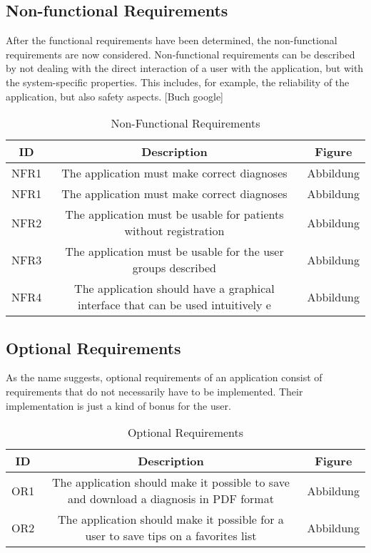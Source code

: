 \subsection{Non-functional Requirements}
After the functional requirements have been determined, the non-functional requirements are now considered. Non-functional requirements can be described by not dealing with the direct interaction of a user with the application, but with the system-specific properties. This includes, for example, the reliability of the application, but also safety aspects. [Buch google]

\begin{table}[H]
	\begin{center}
		\scriptsize
		\def\arraystretch{2}%
		\begin{tabularx}{\textwidth}{ c|c|c }
			\hline
			ID & Description & Figure \\
			\hline
			NFR1 & The application must make correct diagnoses & Abbildung \\
			\hline
			NFR1 & The application must make correct diagnoses & Abbildung \\
			\hline
			NFR2 & The application must be usable for patients without registration & Abbildung \\
			\hline
			NFR3 & The application must be usable for the user groups described & Abbildung \\
			\hline
			NFR4 & The application should have a graphical interface that can be used intuitively e & Abbildung \\
			\hline	
		\end{tabularx}
		\normalsize
	\end{center}
	\caption{Non-Functional Requirements}
\end{table}

\subsection{Optional Requirements}
As the name suggests, optional requirements of an application consist of requirements that do not necessarily have to be implemented. Their implementation is just a kind of bonus for the user.
\begin{table}[H]
	\begin{center}
		\scriptsize
		\def\arraystretch{2}%
		\begin{tabularx}{\textwidth}{ c|c|c }
			\hline
			ID & Description & Figure \\
			\hline
			OR1 & The application should make it possible to save and download a diagnosis in PDF format & Abbildung \\
			\hline
			OR2 & The application should make it possible for a user to save tips on a favorites list & Abbildung \\
			\hline	
		\end{tabularx}
		\normalsize
	\end{center}
	\caption{Optional Requirements}
\end{table}


